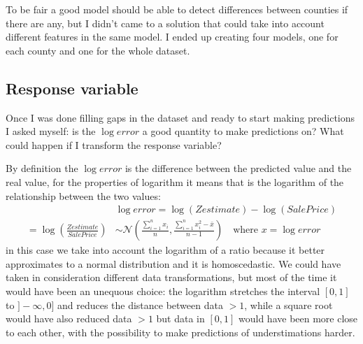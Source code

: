 To be fair a good model should be able to detect differences between counties if there are any, but I didn't came to a solution that could take into account different features in the same model. I ended up creating four models, one for each county and one for the whole dataset.

\subsection{Response variable}

Once I was done filling gaps in the dataset and ready to start making predictions I asked myself: is the $\log{error}$ a good quantity to make predictions on? What could happen if I transform the response variable?

By definition the $\log{error}$ is the difference between the predicted value and the real value, for the properties of logarithm it means that is the logarithm of the relationship between the two values:
$$
\begin{aligned}
    &\log error = \log(Zestimate) - \log(SalePrice)\\
    = \log{\left(\frac{Zestimate}{SalePrice}\right)} &\sim
    \mathcal{N}\left(\frac{\sum_{i=1}^n x_i}{n}, \frac{\sum_{i=1}^n x_i^2 - \bar {x}} {n-1}\right)\quad\text{where }x = \log error 
\end{aligned}
$$
in this case we take into account the logarithm of a ratio because it better approximates to a normal distribution and it is homoscedastic. We could have taken in consideration different data transformations, but most of the time it would have been an unequous choice: the logarithm stretches the interval $[0, 1]$ to $]-\infty, 0]$ and reduces the distance between data $> 1$, while a square root would have also reduced data $>1$ but data in $[0,1]$ would have been more close to each other, with the possibility to make predictions of understimations harder.

